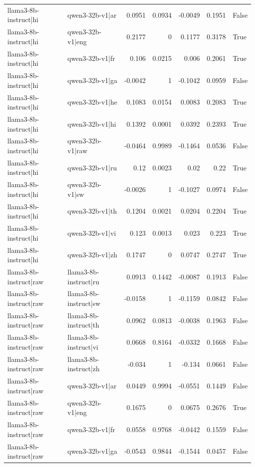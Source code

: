 \begin{table}
\begin{tabular}{l l r r r r l}
llama3-8b-instruct|hi & qwen3-32b-v1|ar & 0.0951 & 0.0934 & -0.0049 & 0.1951 & False \\
llama3-8b-instruct|hi & qwen3-32b-v1|eng & 0.2177 & 0 & 0.1177 & 0.3178 & True \\
llama3-8b-instruct|hi & qwen3-32b-v1|fr & 0.106 & 0.0215 & 0.006 & 0.2061 & True \\
llama3-8b-instruct|hi & qwen3-32b-v1|ga & -0.0042 & 1 & -0.1042 & 0.0959 & False \\
llama3-8b-instruct|hi & qwen3-32b-v1|he & 0.1083 & 0.0154 & 0.0083 & 0.2083 & True \\
llama3-8b-instruct|hi & qwen3-32b-v1|hi & 0.1392 & 0.0001 & 0.0392 & 0.2393 & True \\
llama3-8b-instruct|hi & qwen3-32b-v1|raw & -0.0464 & 0.9989 & -0.1464 & 0.0536 & False \\
llama3-8b-instruct|hi & qwen3-32b-v1|ru & 0.12 & 0.0023 & 0.02 & 0.22 & True \\
llama3-8b-instruct|hi & qwen3-32b-v1|sw & -0.0026 & 1 & -0.1027 & 0.0974 & False \\
llama3-8b-instruct|hi & qwen3-32b-v1|th & 0.1204 & 0.0021 & 0.0204 & 0.2204 & True \\
llama3-8b-instruct|hi & qwen3-32b-v1|vi & 0.123 & 0.0013 & 0.023 & 0.223 & True \\
llama3-8b-instruct|hi & qwen3-32b-v1|zh & 0.1747 & 0 & 0.0747 & 0.2747 & True \\
llama3-8b-instruct|raw & llama3-8b-instruct|ru & 0.0913 & 0.1442 & -0.0087 & 0.1913 & False \\
llama3-8b-instruct|raw & llama3-8b-instruct|sw & -0.0158 & 1 & -0.1159 & 0.0842 & False \\
llama3-8b-instruct|raw & llama3-8b-instruct|th & 0.0962 & 0.0813 & -0.0038 & 0.1963 & False \\
llama3-8b-instruct|raw & llama3-8b-instruct|vi & 0.0668 & 0.8164 & -0.0332 & 0.1668 & False \\
llama3-8b-instruct|raw & llama3-8b-instruct|zh & -0.034 & 1 & -0.134 & 0.0661 & False \\
llama3-8b-instruct|raw & qwen3-32b-v1|ar & 0.0449 & 0.9994 & -0.0551 & 0.1449 & False \\
llama3-8b-instruct|raw & qwen3-32b-v1|eng & 0.1675 & 0 & 0.0675 & 0.2676 & True \\
llama3-8b-instruct|raw & qwen3-32b-v1|fr & 0.0558 & 0.9768 & -0.0442 & 0.1559 & False \\
llama3-8b-instruct|raw & qwen3-32b-v1|ga & -0.0543 & 0.9844 & -0.1544 & 0.0457 & False \\

\end{tabular}
\end{table}
